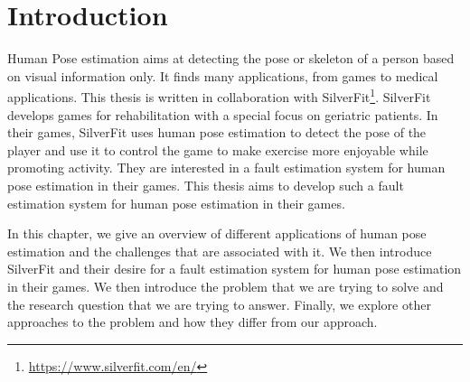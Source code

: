 \chapter{Introduction}
\setcounter{page}{1}

Human Pose estimation aims at detecting the pose or skeleton of a person based on visual information only. It finds many applications, from games to medical applications. This thesis is written in collaboration with SilverFit\footnote{\url{https://www.silverfit.com/en/}}. SilverFit develops games for rehabilitation with a special focus on geriatric patients. In their games, SilverFit uses human pose estimation to detect the pose of the player and use it to control the game to make exercise more enjoyable while promoting activity. They are interested in a fault estimation system for human pose estimation in their games. This thesis aims to develop such a fault estimation system for human pose estimation in their games.

In this chapter, we give an overview of different applications of human pose estimation and the challenges that are associated with it. We then introduce SilverFit and their desire for a fault estimation system for human pose estimation in their games. We then introduce the problem that we are trying to solve and the research question that we are trying to answer. Finally, we explore other approaches to the problem and how they differ from our approach.




